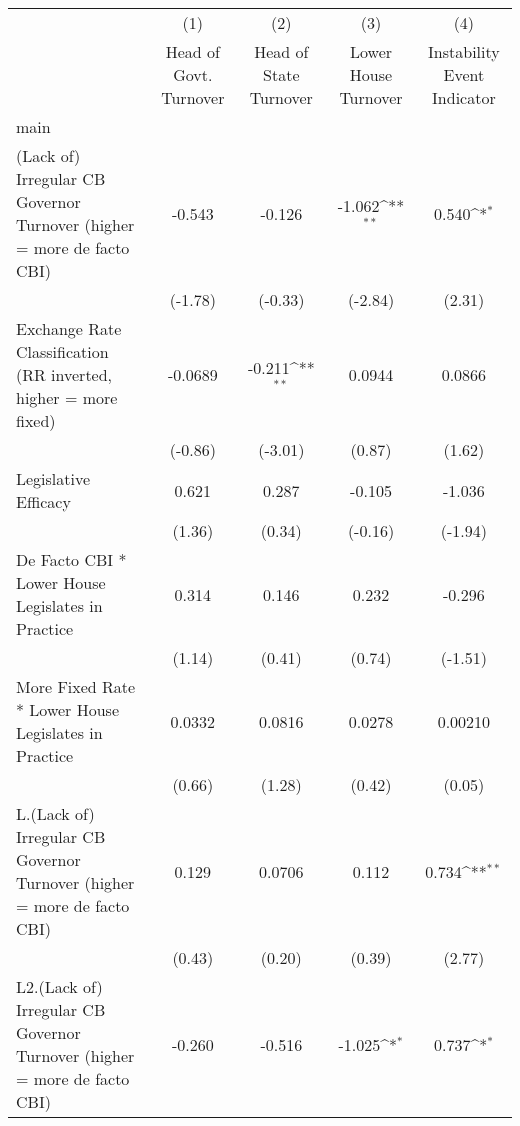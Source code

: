 {
\def\sym#1{\ifmmode^{#1}\else\(^{#1}\)\fi}
\begin{longtable}{l*{4}{c}}
\hline\hline\endfirsthead\hline\endhead\hline\endfoot\endlastfoot
                &\multicolumn{1}{c}{(1)}&\multicolumn{1}{c}{(2)}&\multicolumn{1}{c}{(3)}&\multicolumn{1}{c}{(4)}\\
                &\multicolumn{1}{c}{Head of Govt. Turnover}&\multicolumn{1}{c}{Head of State Turnover}&\multicolumn{1}{c}{Lower House Turnover}&\multicolumn{1}{c}{Instability Event Indicator}\\
\hline
main            &                  &                  &                  &                  \\
(Lack of) Irregular CB Governor Turnover (higher = more de facto CBI)&   -0.543         &   -0.126         &   -1.062\sym{**} &    0.540\sym{*}  \\
                &  (-1.78)         &  (-0.33)         &  (-2.84)         &   (2.31)         \\
[1em]
Exchange Rate Classification (RR inverted, higher = more fixed)&  -0.0689         &   -0.211\sym{**} &   0.0944         &   0.0866         \\
                &  (-0.86)         &  (-3.01)         &   (0.87)         &   (1.62)         \\
[1em]
Legislative Efficacy&    0.621         &    0.287         &   -0.105         &   -1.036         \\
                &   (1.36)         &   (0.34)         &  (-0.16)         &  (-1.94)         \\
[1em]
De Facto CBI * Lower House Legislates in Practice&    0.314         &    0.146         &    0.232         &   -0.296         \\
                &   (1.14)         &   (0.41)         &   (0.74)         &  (-1.51)         \\
[1em]
More Fixed Rate * Lower House Legislates in Practice&   0.0332         &   0.0816         &   0.0278         &  0.00210         \\
                &   (0.66)         &   (1.28)         &   (0.42)         &   (0.05)         \\
[1em]
L.(Lack of) Irregular CB Governor Turnover (higher = more de facto CBI)&    0.129         &   0.0706         &    0.112         &    0.734\sym{**} \\
                &   (0.43)         &   (0.20)         &   (0.39)         &   (2.77)         \\
[1em]
L2.(Lack of) Irregular CB Governor Turnover (higher = more de facto CBI)&   -0.260         &   -0.516         &   -1.025\sym{*}  &    0.737\sym{*}  \\

\end{longtable}}
